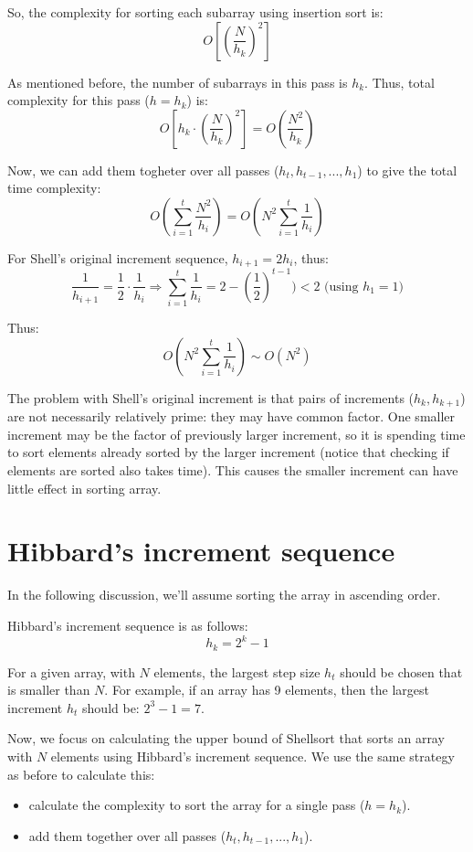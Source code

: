 \documentclass[12pt]{book}
\begin{document}
So, the complexity for sorting each subarray using insertion sort is:
\[
O[(\frac {N} {h_k})^2]
\]

As mentioned before, the number of subarrays in this pass is \(h_k\). Thus, total complexity for this pass (\(h = h _k\)) is:
\[
O[h_k\cdot(\frac {N} {h_k})^2] = O(\frac {N^2} {h_k})
\]

Now, we can add them togheter over all passes (\(h_t, h_{t - 1}, ..., h_1\)) to give the total time complexity:
\[
O(\sum_{i = 1}^{t}\frac {N^2} {h_i}) = O(N^2\sum_{i = 1}^{t} \frac {1} {h_i})
\]

For Shell's original increment sequence, \(h_{i + 1} = 2h_i\), thus:
\[
\frac {1} {h_{i + 1}} = \frac {1} {2} \cdot \frac {1} {h_i} \Rightarrow
\sum_{i = 1}^{t} \frac {1} {h_i} = 2 - (\frac {1} {2})^{t - 1}) < 2 \text { (using } h_1 = 1 \text {)}
\]

Thus:
\[
O(N^2\sum_{i = 1}^{t} \frac {1} {h_i}) \sim O(N^2)
\]

The problem with Shell's original increment is that pairs of increments (\(h_k, h_{k + 1}\)) are not necessarily relatively prime: they may have common factor. One smaller increment may be the factor of previously larger increment, so it is spending time to sort elements already sorted by the larger increment (notice that checking if elements are sorted also takes time). This causes the smaller increment can have little effect in sorting array.
\section{Hibbard's increment sequence}
\label{sec:org96e55c5}
In the following discussion, we'll assume sorting the array in ascending order.

Hibbard's increment sequence is as follows:
\[
h_k = 2^k - 1
\]

For a given array, with \(N\) elements, the largest step size \(h_t\) should be chosen that is smaller than \(N\). For example, if an array has 9 elements, then the largest increment \(h_t\) should be: \(2^3 - 1 = 7\).

Now, we focus on calculating the upper bound of Shellsort that sorts an array with \(N\) elements using Hibbard's increment sequence. We use the same strategy as before to calculate this:
\begin{itemize}
\item calculate the complexity to sort the array for a single pass (\(h = h_k\)).
\item add them together over all passes (\(h_t, h_{t - 1}, ..., h_1\)).
\end{itemize}
\end{document}

